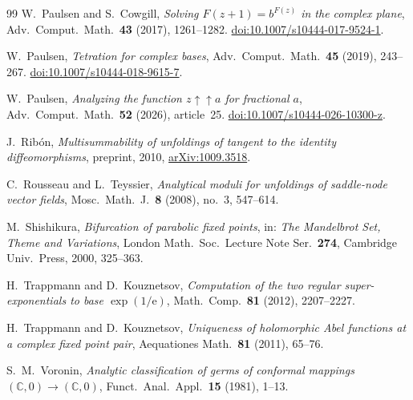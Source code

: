 \documentclass[11pt]{amsart}
\theoremstyle{definition}
\newcommand{\eee}{\mathrm{e}}
\begin{document}
\begin{thebibliography}{99}
W.~Paulsen and S.~Cowgill,
\emph{Solving $F(z+1)=b^{F(z)}$ in the complex plane},
Adv.\ Comput.\ Math.\ \textbf{43} (2017), 1261--1282.
\href{https://doi.org/10.1007/s10444-017-9524-1}{doi:10.1007/s10444-017-9524-1}.

W.~Paulsen,
\emph{Tetration for complex bases},
Adv.\ Comput.\ Math.\ \textbf{45} (2019), 243--267.
\href{https://doi.org/10.1007/s10444-018-9615-7}{doi:10.1007/s10444-018-9615-7}.

W.~Paulsen,
\emph{Analyzing the function $z\uparrow\uparrow a$ for fractional $a$},
Adv.\ Comput.\ Math.\ \textbf{52} (2026), article~25.
\href{https://doi.org/10.1007/s10444-026-10300-z}{doi:10.1007/s10444-026-10300-z}.

J.~Rib\'on,
\emph{Multisummability of unfoldings of tangent to the identity
diffeomorphisms}, preprint, 2010,
\href{https://arxiv.org/abs/1009.3518}{arXiv:1009.3518}.

C.~Rousseau and L.~Teyssier,
\emph{Analytical moduli for unfoldings of saddle-node vector fields},
Mosc.\ Math.\ J.\ \textbf{8} (2008), no.~3, 547--614.

M.~Shishikura,
\emph{Bifurcation of parabolic fixed points},
in: \emph{The Mandelbrot Set, Theme and Variations},
London Math.\ Soc.\ Lecture Note Ser.\ \textbf{274},
Cambridge Univ.\ Press, 2000, 325--363.

H.~Trappmann and D.~Kouznetsov,
\emph{Computation of the two regular super-exponentials to base
$\exp(1/\eee)$},
Math.\ Comp.\ \textbf{81} (2012), 2207--2227.

H.~Trappmann and D.~Kouznetsov,
\emph{Uniqueness of holomorphic Abel functions at a complex fixed point pair},
Aequationes Math.\ \textbf{81} (2011), 65--76.

S.~M.~Voronin,
\emph{Analytic classification of germs of conformal mappings
$(\mathbb C,0)\to(\mathbb C,0)$},
Funct.\ Anal.\ Appl.\ \textbf{15} (1981), 1--13.

\end{thebibliography}
\end{document}
